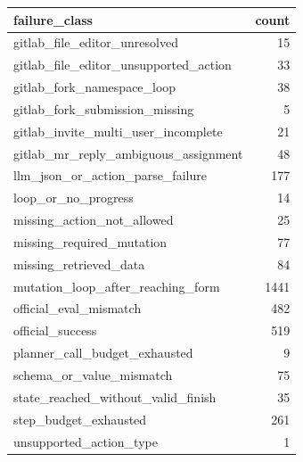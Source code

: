 \begin{tabular}{lr}
\toprule
failure_class & count \\
\midrule
gitlab_file_editor_unresolved & 15 \\
gitlab_file_editor_unsupported_action & 33 \\
gitlab_fork_namespace_loop & 38 \\
gitlab_fork_submission_missing & 5 \\
gitlab_invite_multi_user_incomplete & 21 \\
gitlab_mr_reply_ambiguous_assignment & 48 \\
llm_json_or_action_parse_failure & 177 \\
loop_or_no_progress & 14 \\
missing_action_not_allowed & 25 \\
missing_required_mutation & 77 \\
missing_retrieved_data & 84 \\
mutation_loop_after_reaching_form & 1441 \\
official_eval_mismatch & 482 \\
official_success & 519 \\
planner_call_budget_exhausted & 9 \\
schema_or_value_mismatch & 75 \\
state_reached_without_valid_finish & 35 \\
step_budget_exhausted & 261 \\
unsupported_action_type & 1 \\
\bottomrule
\end{tabular}
